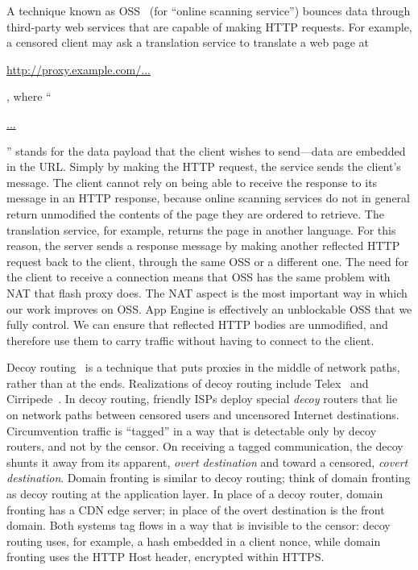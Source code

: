 \documentclass[conference]{IEEEtran}
\begin{document}

A technique known as OSS~\cite{oss} (for
``online scanning service'') bounces data
through third-party web services that are capable of making HTTP requests.
For example, a censored client may ask a translation service to
translate a web page at \begin{NoHyper}\url{http://proxy.example.com/...}\end{NoHyper},
where ``\begin{NoHyper}\url{...}\end{NoHyper}''
stands for the data payload that the client wishes to send---data are embedded in the URL.
Simply by making the HTTP request, the service sends the client's message.
The client cannot rely on being able to receive the response to its message in an HTTP response,
because online scanning services do not in general
return unmodified the contents of the page they are ordered to retrieve.
The translation service, for example, returns the page in another language.
For this reason, the server sends a response message by making
another reflected HTTP request back to the client, through the same OSS or a different one.
The need for the client to receive a connection means that OSS has the same problem with NAT that flash proxy does.
The NAT aspect is the most important way in which our work improves on OSS.
App Engine is effectively an unblockable OSS that we fully control.
We can ensure that reflected HTTP bodies are unmodified, and therefore use them to carry traffic
without having to connect to the client.

Decoy routing~\cite{decoyrouting} is a technique that puts
proxies in the middle of network paths, rather than at the ends.
Realizations of decoy routing include Telex~\cite{telex}
and Cirripede~\cite{cirripede}.
In decoy routing, friendly ISPs deploy special \emph{decoy} routers that lie
on network paths between censored users and uncensored Internet destinations.
Circumvention traffic is ``tagged'' in a way that is detectable only
by decoy routers, and not by the censor.
On receiving a tagged communication, the decoy shunts it away from its apparent, \emph{overt destination}
and toward a censored, \emph{covert destination}.
Domain fronting is similar to decoy routing;
think of domain fronting as decoy routing at the application layer.
In place of a decoy router, domain fronting has a CDN edge server;
in place of the overt destination is the front domain.
Both systems tag flows in a way that is invisible to the censor:
decoy routing uses, for example, a hash embedded in a client nonce,
while domain fronting uses the HTTP Host header, encrypted within HTTPS.
\end{document}
